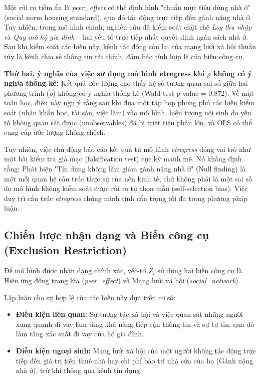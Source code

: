 \documentclass[12pt,a4paper]{report}
\begin{document}
Một rủi ro tiềm ẩn là \textit{peer\_effect} có thể định hình "chuẩn mực tiêu dùng nhà ở" (social norm housing standard), qua đó tác động trực tiếp đến gánh nặng nhà ở. Tuy nhiên, trong mô hình chính, nghiên cứu đã kiểm soát chặt chẽ \textit{Log thu nhập} và \textit{Quy mô hộ gia đình} – hai yếu tố trực tiếp nhất quyết định ngân sách nhà ở. Sau khi kiểm soát các biến này, kênh tác động còn lại của mạng lưới xã hội thuần túy là kênh chia sẻ thông tin tài chính, đảm bảo tính hợp lệ của biến công cụ.

\textbf{Thứ hai, ý nghĩa của việc sử dụng mô hình etregress khi $\rho$ không có ý nghĩa thống kê:} 
Kết quả ước lượng cho thấy hệ số tương quan sai số giữa hai phương trình ($\rho$) không có ý nghĩa thống kê (Wald test p-value = 0.872). Về mặt toán học, điều này ngụ ý rằng sau khi đưa một tập hợp phong phú các biến kiểm soát (nhân khẩu học, tài sản, việc làm) vào mô hình, hiện tượng nội sinh do yếu tố không quan sát được (unobservables) đã bị triệt tiêu phần lớn, và OLS có thể cung cấp ước lượng không chệch. 

Tuy nhiên, việc chủ động báo cáo kết quả từ mô hình \textit{etregress} đóng vai trò như một bài kiểm tra giả mạo (falsification test) cực kỳ mạnh mẽ. Nó khẳng định rằng: Phát hiện "Tín dụng không làm giảm gánh nặng nhà ở" (Null finding) là một mối quan hệ cấu trúc thực sự của nền kinh tế, chứ không phải là một sai số do mô hình không kiểm soát được rủi ro tự chọn mẫu (self-selection bias). Việc duy trì cấu trúc \textit{etregress} chứng minh tính cẩn trọng tối đa trong phương pháp luận.

\subsection{Chiến lược nhận dạng và Biến công cụ (Exclusion Restriction)}

Để mô hình được nhận dạng chính xác, véc-tơ $Z_i$ sử dụng hai biến công cụ là Hiệu ứng đồng trang lứa (\textit{peer\_effect}) và Mạng lưới xã hội (\textit{social\_network}). 

Lập luận cho sự hợp lệ của các biến này dựa trên cơ sở:
\begin{itemize}
	\item \textbf{Điều kiện liên quan:} Sự tương tác xã hội và việc quan sát những người xung quanh đi vay làm tăng khả năng tiếp cận thông tin và sự tự tin, qua đó làm tăng xác suất đi vay của hộ gia đình.
	\item \textbf{Điều kiện ngoại sinh:} Mạng lưới xã hội của một người không tác động trực tiếp đến giá trị tiền thuê nhà hay chi phí bảo trì nhà cửa của họ (Gánh nặng nhà ở), trừ khi thông qua kênh tín dụng.
\end{itemize}
\end{document}
